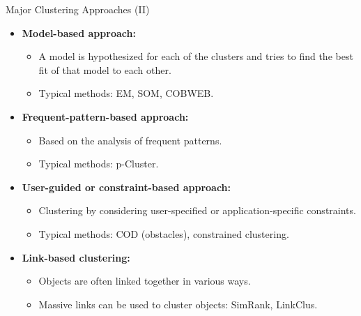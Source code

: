 \begin{frame}{Major Clustering Approaches (II)}
	\begin{itemize}
		\item \textbf{Model-based approach:}
		      \begin{itemize}
			      \item A model is hypothesized for each of the clusters and tries to
			            find the best fit of that model to each other.
			      \item Typical methods: EM, SOM, COBWEB.
		      \end{itemize}
		\item \textbf{Frequent-pattern-based approach:}
		      \begin{itemize}
			      \item Based on the analysis of frequent patterns.
			      \item Typical methods: p-Cluster.
		      \end{itemize}
		\item \textbf{User-guided or constraint-based approach:}
		      \begin{itemize}
			      \item Clustering by considering user-specified or
			            application-specific constraints.
			      \item Typical methods: COD (obstacles), constrained clustering.
		      \end{itemize}
		\item \textbf{Link-based clustering:}
		      \begin{itemize}
			      \item Objects are often linked together in various ways.
			      \item Massive links can be used to cluster objects: SimRank,
			            LinkClus.
		      \end{itemize}
	\end{itemize}
\end{frame}
